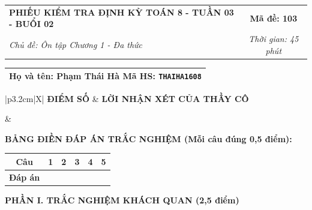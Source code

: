 \documentclass[12pt,a4paper]{article}
\begin{document}
\newpage


\noindent
\begin{tabularx}{\linewidth}{|X|c|}
\hline
\textbf{PHIẾU KIỂM TRA ĐỊNH KỲ TOÁN 8 - TUẦN 03 - BUỔI 02} & \textbf{Mã đề: 103} \\
\textit{Chủ đề: Ôn tập Chương 1 - Đa thức} & \textit{Thời gian: 45 phút} \\
\hline
\end{tabularx}

\vspace{1mm}

\noindent
\begin{tabularx}{\linewidth}{|X|}
\hline
\rule[-2mm]{0pt}{7.5mm}\textbf{Họ và tên:} \textbf{\large Phạm Thái Hà} \hfill \textbf{Mã HS:} \texttt{THAIHA1608} \quad \\
\hline
\end{tabularx}

\vspace{1mm}

\noindent
\begin{tabularx}{\linewidth}{|p{3.2cm}|X|}
\hline
\centering\textbf{ĐIỂM SỐ} & \centering\textbf{LỜI NHẬN XÉT CỦA THẦY CÔ} \tabularnewline
\hline
\rule{0pt}{1.3cm} & \tabularnewline
\hline
\end{tabularx}

\vspace{1.2mm}

\noindent\textbf{BẢNG ĐIỀN ĐÁP ÁN TRẮC NGHIỆM (Mỗi câu đúng 0,5 điểm):}
\vspace{0.8mm}

\noindent
\renewcommand{\arraystretch}{1.35}
\begin{tabularx}{\linewidth}{|c|*{5}{>{\centering\arraybackslash}X|}}
\hline
\textbf{Câu} & \textbf{1} & \textbf{2} & \textbf{3} & \textbf{4} & \textbf{5} \\
\hline
\textbf{Đáp án} & & & & & \\
\hline
\end{tabularx}
\renewcommand{\arraystretch}{1.0}

\vspace{1.5mm}

\noindent\textbf{\large PHẦN I. TRẮC NGHIỆM KHÁCH QUAN (2,5 điểm)}
\vspace{1mm}
\end{document}
